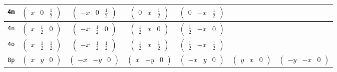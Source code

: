\documentclass[fleqn,9pt,landscape]{jsarticle}
\begin{document}
\begin{center}
\begin{longtable}{ccccccc}
{\tt 4m} & $ \begin{pmatrix} x & 0 & \frac{1}{2} \end{pmatrix} $ & $ \begin{pmatrix} - x & 0 & \frac{1}{2} \end{pmatrix} $ & $ \begin{pmatrix} 0 & x & \frac{1}{2} \end{pmatrix} $ & $ \begin{pmatrix} 0 & - x & \frac{1}{2} \end{pmatrix} $ & $  $ & $  $ \\ \hline
{\tt 4n} & $ \begin{pmatrix} x & \frac{1}{2} & 0 \end{pmatrix} $ & $ \begin{pmatrix} - x & \frac{1}{2} & 0 \end{pmatrix} $ & $ \begin{pmatrix} \frac{1}{2} & x & 0 \end{pmatrix} $ & $ \begin{pmatrix} \frac{1}{2} & - x & 0 \end{pmatrix} $ & $  $ & $  $ \\ \hline
{\tt 4o} & $ \begin{pmatrix} x & \frac{1}{2} & \frac{1}{2} \end{pmatrix} $ & $ \begin{pmatrix} - x & \frac{1}{2} & \frac{1}{2} \end{pmatrix} $ & $ \begin{pmatrix} \frac{1}{2} & x & \frac{1}{2} \end{pmatrix} $ & $ \begin{pmatrix} \frac{1}{2} & - x & \frac{1}{2} \end{pmatrix} $ & $  $ & $  $ \\ \hline
{\tt 8p} & $ \begin{pmatrix} x & y & 0 \end{pmatrix} $ & $ \begin{pmatrix} - x & - y & 0 \end{pmatrix} $ & $ \begin{pmatrix} x & - y & 0 \end{pmatrix} $ & $ \begin{pmatrix} - x & y & 0 \end{pmatrix} $ & $ \begin{pmatrix} y & x & 0 \end{pmatrix} $ & $ \begin{pmatrix} - y & - x & 0 \end{pmatrix} $ \\

\end{longtable}
\end{center}
\end{document}
